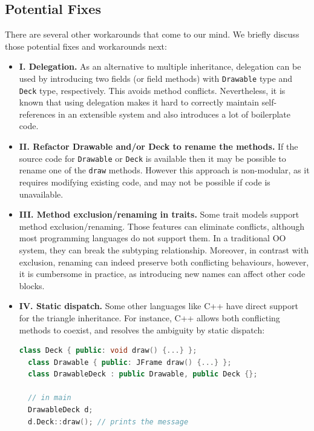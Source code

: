 \subsection{Potential Fixes}

There are several other workarounds
that come to our mind. We briefly discuss those potential fixes and
workarounds next:
\begin{itemize}
  \item \textbf{I. Delegation.} As an alternative to multiple inheritance,
  delegation can be used by introducing two fields (or field methods) with
  \lstinline|Drawable| type and \lstinline|Deck| type,
  respectively. This avoids method conflicts. Nevertheless, it is known
  that using delegation makes it hard to correctly maintain
  self-references in an extensible system and also
  introduces a lot of boilerplate code.
  \item \textbf{II. Refactor Drawable and/or Deck to rename the methods.} If
  the source code for \lstinline|Drawable| or \lstinline|Deck| is available
  then it may be possible to rename one of the \lstinline|draw|
  methods. However this approach is non-modular, as it requires 
  modifying existing code, and may not be possible if code is unavailable.
  \item \textbf{III. Method exclusion/renaming in traits.} Some trait models
  support method exclusion/renaming. Those features
   can eliminate conflicts, although most
  programming languages do not support them. In a traditional OO system,
  they can break the subtyping relationship. Moreover, in
  contrast with exclusion, renaming can indeed preserve both conflicting
  behaviours, however, it is cumbersome in practice, as introducing new
  names can affect other code blocks.
  \item \textbf{IV. Static dispatch.} Some other languages like C++ have
  direct support for the triangle inheritance. For instance, C++ allows both
  conflicting methods to coexist, and resolves the ambiguity by static dispatch:
  \vspace{3pt}\begin{lstlisting}[language=c++]
  class Deck { public: void draw() {...} };
  class Drawable { public: JFrame draw() {...} };
  class DrawableDeck : public Drawable, public Deck {};
  
  // in main
  DrawableDeck d;
  d.Deck::draw(); // prints the message
  \end{lstlisting}\vspace{3pt}
\end{itemize}

